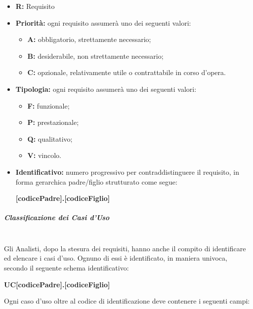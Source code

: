 					\begin{itemize}
						\item \textbf{R:} Requisito 
						\item \textbf{Priorità:} ogni requisito assumerà uno dei seguenti valori:
						\begin{itemize}
							\item \textbf{A:} obbligatorio, strettamente necessario;
							\item \textbf{B:} desiderabile, non strettamente necessario;
							\item \textbf{C:} opzionale, relativamente utile o contrattabile in corso d'opera.
						\end{itemize}
						\item \textbf{Tipologia:} ogni requisito assumerà uno dei seguenti valori:
						\begin{itemize}
							\item \textbf{F:} funzionale;
							\item \textbf{P:} prestazionale;
							\item \textbf{Q:} qualitativo;
							\item \textbf{V:} vincolo.
						\end{itemize}
						\item \textbf{Identificativo:} numero progressivo per contraddistinguere il requisito, in forma gerarchica padre/figlio strutturato come segue: 
						\begin{center}
							\textbf{[codicePadre].[codiceFiglio]}
						\end{center}
					\end{itemize}
				\subparagraph{Classificazione dei Casi d'Uso \\ \\}
					Gli Analisti, dopo la stesura dei requisiti, hanno anche il compito di identificare ed elencare i casi d’uso. Ognuno di essi è identificato, in maniera univoca, secondo il seguente schema identificativo:
					\begin{center}
						\textbf{UC[codicePadre].[codiceFiglio]}
					\end{center}
					Ogni caso d'uso oltre al codice di identificazione deve contenere i seguenti campi:
